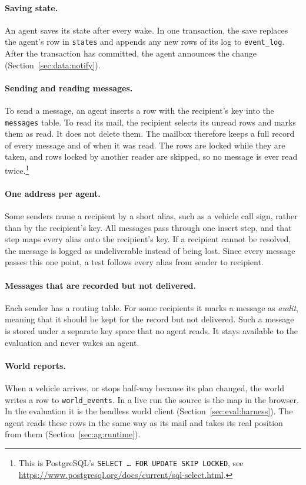 \paragraph{Saving state.} An agent saves its state after every wake. In one
transaction, the save replaces the agent's row in \texttt{states} and appends
any new rows of its log to \texttt{event\_log}. After the transaction has
committed, the agent announces the change (Section~\ref{sec:data:notify}).

\paragraph{Sending and reading messages.} To send a message, an agent inserts a
row with the recipient's key into the \texttt{messages} table. To read its mail, the
recipient selects its unread rows and marks them as read. It does not delete
them. The mailbox therefore keeps a full record of every message and of when it
was read. The rows are locked while they are taken, and rows locked by another
reader are skipped, so no message is ever read twice.\footnote{This is
PostgreSQL's \texttt{SELECT \dots\ FOR UPDATE SKIP LOCKED}, see
\url{https://www.postgresql.org/docs/current/sql-select.html}.}

\paragraph{One address per agent.} Some senders name a recipient by a short
alias, such as a vehicle call sign, rather than by the recipient's key. All
messages pass through one insert step, and that step maps every alias onto the
recipient's key. If a recipient cannot be resolved, the message is logged as
undeliverable instead of being lost. Since every message passes this one
point, a test follows every alias from sender to recipient.

\paragraph{Messages that are recorded but not delivered.} Each sender has a
routing table. For some recipients it marks a message as \emph{audit}, meaning
that it should be kept for the record but not delivered. Such a message is
stored under a separate key space that no agent reads. It stays available to
the evaluation and never wakes an agent.

\paragraph{World reports.} When a vehicle arrives, or stops half-way because
its plan changed, the world writes a row to \texttt{world\_events}. In a live
run the source is the map in the browser. In the evaluation it is the headless
world client (Section~\ref{sec:eval:harness}). The agent reads these rows in
the same way as its mail and takes its real position from them
(Section~\ref{sec:ag:runtime}).

